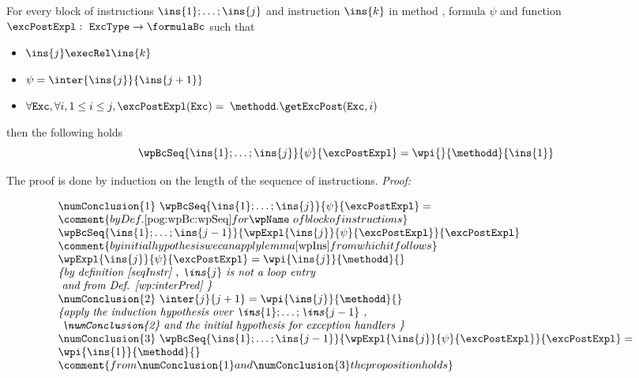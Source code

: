  \begin{wpBlock}\label{wpBlock}
  For every block of instructions $\ins{1}; \dots;\ins{j} $  and instruction $\ins{k}$  in  method \methodd,
  formula $\psi$ and function $\excPostExpl : \mbox{ \rm \texttt{ExcType}}  \rightarrow \formulaBc $  such that
 \begin{itemize} 
    \item $\ins{j} \execRel \ins{k}$
    \item  $\psi = \inter{\ins{j}}{\ins{j+1}}$

     \item $\forall \mbox{\rm\texttt{Exc}} ,  \forall i, 1 \le i \le j,  \excPostExpl( \mbox{\rm\texttt{Exc}} ) =$ 
                  $ \methodd.\getExcPost(\mbox{\rm\texttt{Exc}}, i ) $ 


   
\end{itemize}
then the following holds
     $$   \wpBcSeq{\ins{1}; \dots;\ins{j} }{\psi }{\excPostExpl} = \wpi{}{\methodd}{\ins{1} }$$        
\end{wpBlock} 

The proof is done by induction on the length of the sequence of instructions.
\textit{Proof:}

$$
\begin{array}{l}
  \numConclusion{1} \ \wpBcSeq{\ins{1}; \dots;\ins{j} }{\psi }{\excPostExpl} = \\
   \comment{by Def. \ref{pog:wpBc:wpSeq} for \wpName \ of block of instructions } \\
   \wpBcSeq{\ins{1}; \ldots;\ins{j -1 } }{\wpExpl{ \ins{j} }{ \psi }{ \excPostExpl}  }{\excPostExpl } \\
   \comment{by initial hypothesis we can apply lemma \ref{wpIns} from which it follows } \\
   \wpExpl{ \ins{j} }{ \psi }{ \excPostExpl}  = \wpi{\ins{j}}{\methodd}{} \\
   \mbox{\rm\textit{\{by definition \ref{seqInstr} ,  $\ins{j}$ is not a loop entry }} \\
   \mbox{\rm\textit{ and from Def. \ref{wp:interPred} \}}} \\
   \numConclusion{2} \ \inter{j}{j+1} =\wpi{\ins{j}}{\methodd}{} \\
   \mbox{\rm\textit{\{apply the induction hypothesis over $\ins{1}; \ldots;\ins{j -1 } $  , }}\\
   \mbox{\rm\textit{ \numConclusion{2} and the initial hypothesis for exception handlers \}}}\\
   \numConclusion{3} \ \wpBcSeq{\ins{1}; \dots;\ins{j -1 } }{\wpExpl{ \ins{j} }{ \psi }{ \excPostExpl}  }{\excPostExpl } = \\
   \wpi{\ins{1}}{\methodd}{} \\  
   \comment{from  \numConclusion{1} and \numConclusion{3} the proposition holds}
\end{array}
$$
\Qed \\


